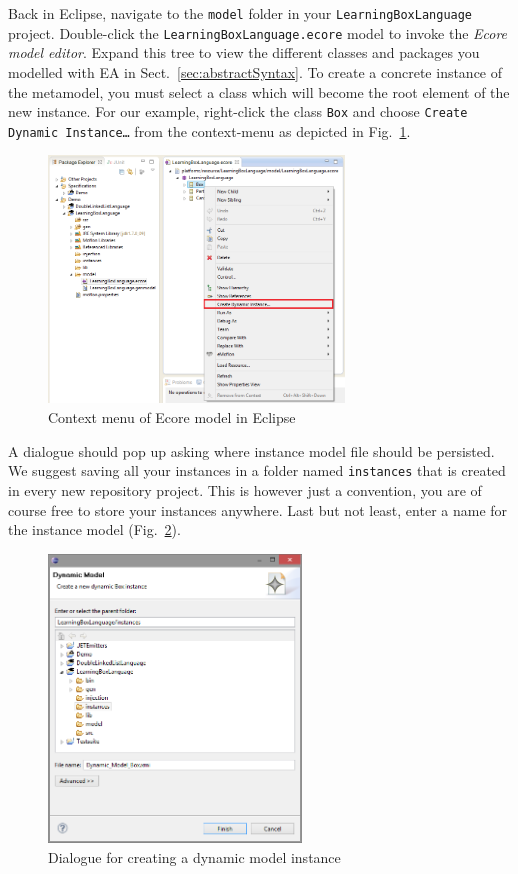 Back in Eclipse, navigate to the \texttt{model} folder in your \texttt{LearningBoxLanguage} project.
Double-click the \texttt{LearningBoxLanguage.ecore} model to invoke  the \emph{Ecore model editor}.
Expand this tree to view the different classes and packages you modelled with EA in Sect.~\ref{sec:abstractSyntax}.
To create a concrete instance of the metamodel, you must select a class which will become the root element of the new instance.
For our example, right-click the class \texttt{Box} and choose \texttt{Create Dynamic Instance\ldots} from the context-menu as depicted in Fig.~\ref{fig:context_menu}.

\begin{figure}[htbp]
	\centering
  \includegraphics[width=0.7\textwidth]{pics/modelBrowserBilder/createInstance.png}
	\caption{Context menu of Ecore model in Eclipse}
	\label{fig:context_menu}
\end{figure}

A dialogue should pop up asking where instance model file should be persisted.
We suggest saving all your instances in a folder named \texttt{instances} that is created in every new repository project.
This is however just a convention, you are of course free to store your instances anywhere.
Last but not least, enter a name for the instance model (Fig.~\ref{fig:store_dynamic_instance}).

\begin{figure}[htbp]
	\centering
  \includegraphics[width=0.6\textwidth]{pics/modelBrowserBilder/persistDialog.png}
	\caption{Dialogue for creating a dynamic model instance}
	\label{fig:store_dynamic_instance}
\end{figure}

